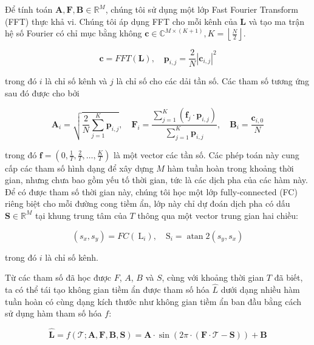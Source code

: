 Để tính toán $\mathbf{A}, \mathbf{F}, \mathbf{B} \in \mathbb{R}^{M}$, chúng tôi sử dụng một lớp Fast Fourier Transform (FFT) thực khả vi. Chúng tôi áp dụng FFT cho mỗi kênh của $\mathbf{L}$ và tạo ma trận hệ số Fourier có chỉ mục bằng không $\mathbf{c} \in \mathbb{C}^{M \times (K+1)}, K=\left\lfloor \frac{N}{2} \right\rfloor$.

\begin{equation}
	\label{eq:fft}
	\mathbf{c}=F F T(\mathbf{L}), \quad \mathbf{p}_{i, j}=\frac{2}{N}\left|\mathbf{c}_{i, j}\right|^2
\end{equation}

trong đó $i$ là chỉ số kênh và $j$ là chỉ số cho các dải tần số. Các tham số tương ứng sau đó được cho bởi


\begin{equation}
	\label{eq:PhaseExtraction}
	\mathbf{A}_i=\sqrt{\frac{2}{N} \sum_{j=1}^K \mathbf{p}_{i, j}}, \quad \mathbf{F}_i=\frac{\sum_{j=1}^K\left(\mathbf{f}_j \cdot \mathbf{p}_{i, j}\right)}{\sum_{j=1}^K \mathbf{p}_{i, j}}, \quad \mathbf{B}_i=\frac{\mathbf{c}_{i, 0}}{N}
\end{equation}

trong đó $\textbf{f} = (0, \frac{1}{T}, \frac{2}{T}, \dots, \frac{K}{T})$ là một vector các tần số. Các phép toán này cung cấp các tham số hình dạng để xây dựng $M$ hàm tuần hoàn trong khoảng thời gian, nhưng chưa bao gồm yếu tố thời gian, tức là các dịch pha của các hàm này. Để có được tham số thời gian này, chúng tôi học một lớp fully-connected (FC) riêng biệt cho mỗi đường cong tiềm ẩn, lớp này chỉ dự đoán dịch pha có dấu $\textbf{S} \in \mathbb{R}^{M}$ tại khung trung tâm của $T$ thông qua một vector trung gian hai chiều:

\begin{equation}
	\label{eq:OffsetExtraction}
	\left(s_x, s_y\right)=F C\left(\mathrm{~L}_i\right), \quad \mathrm{S}_i=\operatorname{atan} 2\left(s_y, s_x\right)
\end{equation}

trong đó $i$ là chỉ số kênh.

Từ các tham số đã học được $F$, $A$, $B$ và $S$, cùng với khoảng thời gian $T$ đã biết, ta có thể tái tạo không gian tiềm ẩn được tham số hóa $\hat{L}$ dưới dạng nhiều hàm tuần hoàn có cùng dạng kích thước như không gian tiềm ẩn ban đầu bằng cách sử dụng hàm tham số hóa $f$:

\begin{equation}
	\label{eq:Sinusoidal}
	\hat{\mathbf{L}}=f(\mathcal{T} ; \mathbf{A}, \mathbf{F}, \mathbf{B}, \mathbf{S})=\mathbf{A} \cdot \sin (2 \pi \cdot(\mathbf{F} \cdot \mathcal{T}-\mathbf{S}))+\mathbf{B}
\end{equation}


